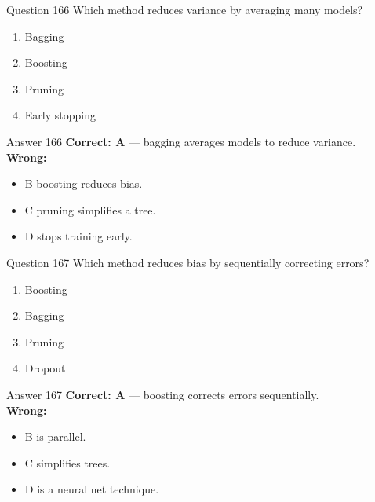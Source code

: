 \documentclass[aspectratio=169,11pt]{beamer}
\begin{document}
	\begin{frame}{Question 166}
		Which method reduces variance by averaging many models?
		\begin{enumerate}[label=\Alph*.]
			\item Bagging
			\item Boosting
			\item Pruning
			\item Early stopping
		\end{enumerate}
	\end{frame}
	\begin{frame}{Answer 166}
		\textbf{Correct: A} --- bagging averages models to reduce variance.\\
		\vspace{0.5em}
		\textbf{Wrong:}
		\begin{itemize}
			\item B boosting reduces bias.
			\item C pruning simplifies a tree.
			\item D stops training early.
		\end{itemize}
	\end{frame}
	
	\begin{frame}{Question 167}
		Which method reduces bias by sequentially correcting errors?
		\begin{enumerate}[label=\Alph*.]
			\item Boosting
			\item Bagging
			\item Pruning
			\item Dropout
		\end{enumerate}
	\end{frame}
	\begin{frame}{Answer 167}
		\textbf{Correct: A} --- boosting corrects errors sequentially.\\
		\vspace{0.5em}
		\textbf{Wrong:}
		\begin{itemize}
			\item B is parallel.
			\item C simplifies trees.
			\item D is a neural net technique.
		\end{itemize}
	\end{frame}
	
\end{document}
